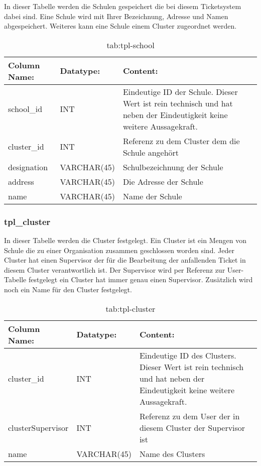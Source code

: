 In dieser Tabelle werden die Schulen gespeichert die bei diesem Ticketsystem dabei sind.
Eine Schule wird mit Ihrer Bezeichnung, Adresse und Namen abgespeichert. Weiteres kann eine Schule einem Cluster zugeordnet werden. 

\begin{table}[h]
	\begin{tabular}{|p{3.5cm}|p{4cm}|p{6.2cm}|}
		\hline
		\textbf{Column Name:} & \textbf{Datatype:} & \textbf{Content:}\\
		\hline
		school\_id & INT & Eindeutige ID der Schule. Dieser Wert ist rein technisch und hat neben der Eindeutigkeit keine weitere Aussagekraft.\\
		\hline
		cluster\_id & INT & Referenz zu dem Cluster dem die Schule angehört\\
		\hline
		designation & VARCHAR(45) & Schulbezeichnung der Schule\\
		\hline
		address & VARCHAR(45) & Die Adresse der Schule\\
		\hline
		name & VARCHAR(45) & Name der Schule\\
		\hline
	\end{tabular}
	\caption{tab:tpl-school}
\end{table}
\label{tab:tpl_school}

\newpage

\subsubsection{tpl\_cluster}

In dieser Tabelle werden die Cluster festgelegt. Ein Cluster ist ein Mengen von Schule die zu einer Organisation zusammen geschlossen worden sind. Jeder Cluster hat einen Supervisor der für die Bearbeitung der anfallenden Ticket in diesem Cluster verantwortlich ist.
Der Supervisor wird per Referenz zur User-Tabelle festgelegt ein Cluster hat immer genau einen Supervisor. Zusätzlich wird noch ein Name für den Cluster festgelegt.

\begin{table}[h]
	\begin{tabular}{|p{3.5cm}|p{4cm}|p{6.2cm}|}
		\hline
		\textbf{Column Name:} & \textbf{Datatype:} & \textbf{Content:}\\
		\hline
		cluster\_id & INT & Eindeutige ID des Clusters. Dieser Wert ist rein technisch und hat neben der Eindeutigkeit keine weitere Aussagekraft.\\
		\hline
		clusterSupervisor & INT & Referenz zu dem User der in diesem Cluster der Supervisor ist\\
		\hline
		name & VARCHAR(45) & Name des Clusters\\
		\hline
	\end{tabular}
	\caption{tab:tpl-cluster}
\end{table}
\label{tab:tpl_cluster}

